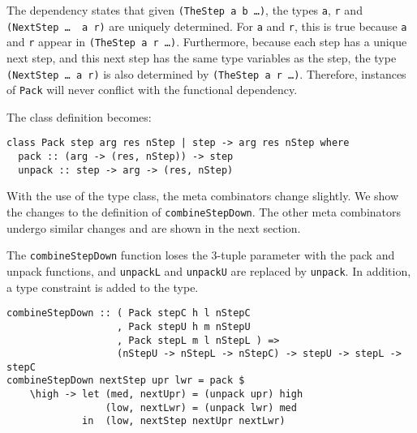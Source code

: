 \par  The dependency states that given \texttt{(TheStep a b \dots)}, the
        types \texttt{a}, \texttt{r} and \texttt{(NextStep \dots~ a r)} are uniquely
        determined. For \texttt{a} and \texttt{r}, this is true because \texttt{a} and
        \texttt{r} appear in \texttt{(TheStep a r \dots)}. Furthermore, because each
        step has a unique next step, and this next step has the same type variables as
        the step, the type \texttt{(NextStep \dots~a r)} is also determined by
        \texttt{(TheStep a r \dots)}. Therefore, instances of \texttt{Pack} will never
        conflict with the functional dependency.
\par  The class definition becomes:\begin{small}\begin{verbatim}class Pack step arg res nStep | step -> arg res nStep where
  pack :: (arg -> (res, nStep)) -> step
  unpack :: step -> arg -> (res, nStep)\end{verbatim}\end{small}

\par With the use of the type class, the meta combinators change slightly.
        We show the changes to the definition of \texttt{combineStepDown}. The other
        meta combinators undergo similar changes and are shown in the next section.
\par The \texttt{combineStepDown} function loses the 3-tuple parameter with
        the pack and unpack functions, and \texttt{unpackL} and \texttt{unpackU} are
        replaced by \texttt{unpack}. In addition, a type constraint is added to the
        type.\begin{small}\begin{verbatim}combineStepDown :: ( Pack stepC h l nStepC 
                   , Pack stepU h m nStepU
                   , Pack stepL m l nStepL ) => 
                   (nStepU -> nStepL -> nStepC) -> stepU -> stepL -> stepC
combineStepDown nextStep upr lwr = pack $
    \high -> let (med, nextUpr) = (unpack upr) high
                 (low, nextLwr) = (unpack lwr) med
             in  (low, nextStep nextUpr nextLwr)\end{verbatim}\end{small}

